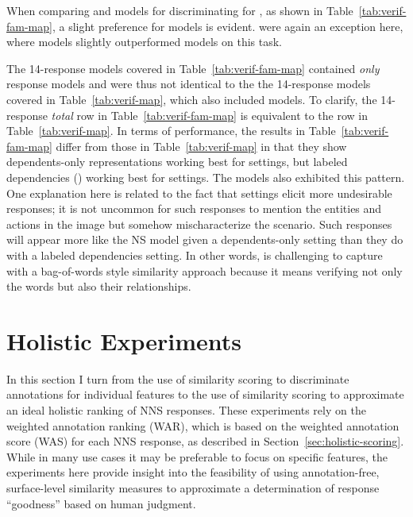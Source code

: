 When comparing  and  models for discriminating for , as shown in Table~\ref{tab:verif-fam-map}, a slight preference for  models is evident.  were again an exception here, where  models slightly outperformed  models on this task.

The  14-response models covered in Table~\ref{tab:verif-fam-map} contained \textit{only}  response models and were thus not identical to the the  14-response models covered in Table~\ref{tab:verif-map}, which also included  models. To clarify, the  14-response \textit{total} row in Table~\ref{tab:verif-fam-map} is equivalent to the  row in Table~\ref{tab:verif-map}. In terms of performance, the  results in Table~\ref{tab:verif-fam-map} differ from those in Table~\ref{tab:verif-map} in that they show dependents-only representations working best for  settings, but labeled dependencies () working best for  settings. The  models also exhibited this pattern. One explanation here is related to the fact that   settings elicit more undesirable responses; it is not uncommon for such responses to mention the entities and actions in the image but somehow mischaracterize the scenario. Such responses will appear more like the NS model given a dependents-only setting than they do with a labeled dependencies setting. In other words,  is challenging to capture with a bag-of-words style similarity approach because it means verifying not only the words but also their relationships.


\section{Holistic Experiments}
\label{sec:exp-holistic}
In this section I turn from the use of similarity scoring to discriminate annotations for individual features to the use of similarity scoring to approximate an ideal holistic ranking of NNS responses. These experiments rely on the weighted annotation ranking (WAR), which is based on the weighted annotation score (WAS) for each NNS response, as described in Section~\ref{sec:holistic-scoring}. While in many use cases it may be preferable to focus on specific features, the experiments here provide insight into the feasibility of using annotation-free, surface-level similarity measures to approximate a determination of response ``goodness'' based on human judgment.

